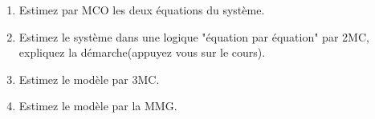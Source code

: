 \begin{enumerate}
\item Estimez par MCO les deux équations du système. 
\item Estimez le système dans une logique "équation par équation" par 2MC, 
expliquez la démarche(appuyez vous sur le cours).
\item Estimez le modèle par 3MC. 
\item Estimez le modèle par la MMG.
\end{enumerate}





 
